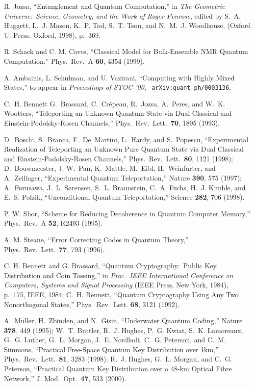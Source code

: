 \begin{thebibliography}{10}
R. Jozsa, ``Entanglement and Quantum Computation,'' in {\sl The
Geometric Universe:\ Science, Geometry, and the Work of Roger
Penrose}, edited by S.~A. Huggett, L.~J. Mason, K.~P. Tod, S.~T.
Tsou, and N.~M.~J. Woodhouse, (Oxford U. Press, Oxford, 1998),
p.~369.

R. Schack and C. M. Caves, ``Classical Model for Bulk-Ensemble NMR
Quantum Computation,'' Phys.\ Rev.\ A {\bf 60}, 4354 (1999).

A. Ambainis, L. Schulman, and U. Vazirani, ``Computing with Highly
Mixed States,'' to appear in {\sl Proceedings of STOC '00\/}, {\tt
arXiv:quant-ph/0003136}.

C.~H. Bennett G.~Brassard, C.~Cr\'{e}peau, R.~Jozsa, A.~Peres, and
W.~K. Wootters, ``Teleporting an Unknown Quantum State via Dual
Classical and Einstein-Podolsky-Rosen Channels,'' Phys.\ Rev.\
Lett.\ {\bf 70}, 1895 (1993).

D.~Boschi, S.~Branca, F.~De~Martini, L.~Hardy, and S.~Popescu,
``Experimental Realization of Teleporting an Unknown Pure Quantum
State via Dual Classical and Einstein-Podolsky-Rosen Channels,''
Phys.\ Rev.\ Lett.\ {\bf 80}, 1121 (1998); D.~Bouwmeester,
J.-W.~Pan, K.~Mattle, M.~Eibl, H.~Weinfurter, and A.~Zeilinger,
``Experimental Quantum Teleportation,'' Nature {\bf 390}, 575
(1997); A.~Furusawa, J.~L. S{\o}rensen, S.~L. Braunstein, C.~A.
Fuchs, H.~J. Kimble, and E.~S. Polzik, ``Unconditional Quantum
Teleportation,'' Science {\bf 282}, 706 (1998).

P. W. Shor, ``Scheme for Reducing Decoherence in Quantum Computer
Memory,'' Phys.\ Rev.\ A {\bf 52}, R2493 (1995).

A. M. Steane, ``Error Correcting Codes in Quantum Theory,'' Phys.\
Rev.\ Lett.\ {\bf 77}, 793 (1996).

C. H. Bennett and G. Brassard, ``Quantum Cryptography:\ Public Key
Distribution and Coin Tossing,'' in {\sl Proc.\ IEEE International
Conference on Computers, Systems and Signal Processing\/} (IEEE
Press, New York, 1984), p.~175, IEEE, 1984; C.~H. Bennett, ``Quantum
Cryptography Using Any Two Nonorthogonal States,'' Phys.\ Rev.\
Lett. {\bf 68}, 3121 (1992).

\bibitem{CryptoExperiments}
A.~Muller, H.~Zbinden, and N.~Gisin, ``Underwater Quantum Coding,''
Nature {\bf 378}, 449 (1995);  W.~T. Buttler, R.~J. Hughes, P.~G.
Kwiat, S.~K. Lamoreaux, G.~G. Luther, G.~L. Morgan, J.~E. Nordholt,
C.~G. Peterson, and C.~M. Simmons, ``Practical Free-Space Quantum Key
Distribution over 1km,'' Phys.\ Rev.\ Lett.\ {\bf 81}, 3283 (1998);
R.~J. Hughes, G.~L. Morgan, and C.~G. Peterson, ``Practical Quantum
Key Distribution over a 48-km Optical Fibre Network,'' J. Mod.\ Opt.\
{\bf 47}, 533 (2000).


\end{thebibliography}
